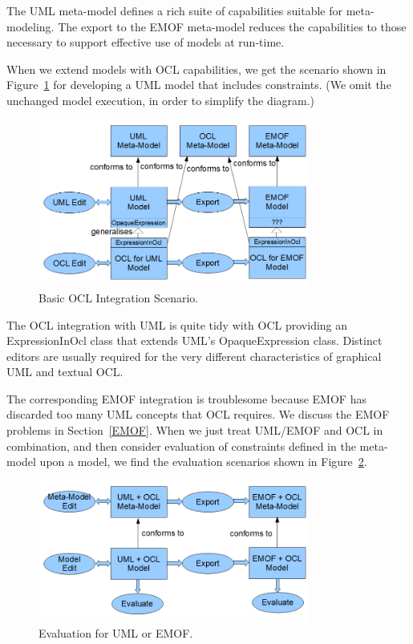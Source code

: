 \documentclass{eceasst}
\begin{document}
The UML meta-model defines a rich suite of capabilities suitable for meta-modeling. The export to the EMOF meta-model reduces the capabilities to those necessary to support effective use of models at run-time.

When we extend models with OCL capabilities, we get the scenario shown in Figure~\ref{fig:BasicOCLScenario} for developing a UML model that includes constraints. (We omit the unchanged model execution, in order to simplify the diagram.) 

\begin{figure}
  \begin{center}
    \includegraphics[width=3.5in]{BasicOCLScenario.png}
  \end{center}
  \caption{Basic OCL Integration Scenario.}
  \label{fig:BasicOCLScenario}
\end{figure}

The OCL integration with UML is quite tidy with OCL providing an ExpressionInOcl class that extends UML's OpaqueExpression class. Distinct editors are usually required for the very different characteristics of graphical UML and textual OCL.

The corresponding EMOF integration is troublesome because EMOF has discarded too many UML concepts that OCL requires. 
We discuss the EMOF problems in Section~\ref{EMOF}. When we just treat UML/EMOF and OCL in combination, and then consider evaluation of constraints defined in the meta-model upon a model, we find the evaluation scenarios shown in Figure~\ref{fig:M2Evaluation}.

\begin{figure}
  \begin{center}
    \includegraphics[width=3.5in]{M2Evaluation.png}
  \end{center}
  \caption{Evaluation for UML or EMOF.}
  \label{fig:M2Evaluation}
\end{figure}
\end{document}
